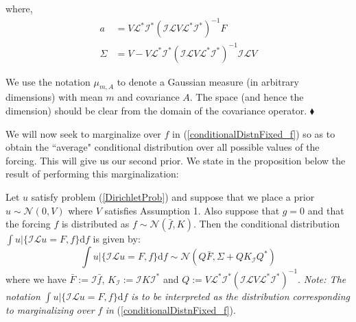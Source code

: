 where,
\begin{align}
    \label{post_mean_before_averaging}
    a &= V\mathcal{L}^{*}\mathcal{I}^{*}(\mathcal{I}\mathcal{L}V\mathcal{L}^{*}\mathcal{I}^{*})^{-1}F \\
    \label{post_var_before_averaging}
    \Sigma &= V - V\mathcal{L}^{*}\mathcal{I}^{*}(\mathcal{I}\mathcal{L}V\mathcal{L}^{*}\mathcal{I}^{*})^{-1}\mathcal{I}\mathcal{L}V
\end{align}
\begin{remark}
We use the notation $\mu_{m,A}$ to denote a Gaussian measure (in arbitrary dimensions) with mean $m$ and covariance $A$. The space (and hence the dimension) should be clear from the domain of the covariance operator.
$\mathbin{\blacklozenge}$
\end{remark}

We will now seek to marginalize over $f$ in (\ref{conditionalDistnFixed_f}) so as to obtain the ``average" conditional distribution over all possible values of the forcing. This will give us our second prior. We state in the proposition below the result of performing this marginalization: \vspace{5pt}

\begin{proposition}
    \label{first_prop}
    Let $u$ satisfy problem (\ref{DirichletProb}) and suppose that we place a prior $u\sim\mathcal{N}(0,V)$ where $V$ satisfies Assumption 1. Also suppose that $g=0$ and that the forcing $f$ is distributed as $f\sim\mathcal{N}(\bar{f},K)$. Then the conditional distribution $\int u|\{\mathcal{I}\mathcal{L}u=F,f\}\mathrm{d}f$ is given by:
    \begin{equation}
        \label{approx_prior}
        \int u|\{\mathcal{I}\mathcal{L}u=F,f\}\mathrm{d}f\sim\mathcal{N}(Q\bar{F},\Sigma+QK_{\mathcal{I}}Q^{*})
    \end{equation}
    where we have $\bar{F}:=\mathcal{I}\bar{f}$, $K_{\mathcal{I}}:=\mathcal{I}K\mathcal{I}^{*}$ and $Q:=V\mathcal{L}^{*}\mathcal{I}^{*}(\mathcal{I}\mathcal{L}V\mathcal{L}^{*}\mathcal{I}^{*})^{-1}$. \textit{Note: The notation} $\int u|\{\mathcal{I}\mathcal{L}u=F,f\}\mathrm{d}f$ \textit{is to be interpreted as the distribution corresponding to marginalizing over} $f$ \textit{in} (\ref{conditionalDistnFixed_f}).
\end{proposition}

